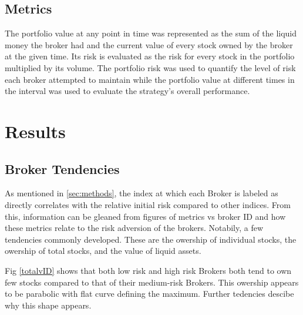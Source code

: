 \documentclass[letterpaper, 10 pt, proceedings]{ieeetran}
\begin{document}
	\subsection{Metrics}\label{subsec:metrics}	
	The portfolio value at any point in time was represented as the sum of the liquid money the broker had and the current value of every stock owned by the broker at the given time. Its risk is evaluated as the risk for every stock in the portfolio multiplied by its volume. The portfolio risk was used to quantify the level of risk each broker attempted to maintain while the portfolio value at different times in the interval was used to evaluate the strategy's overall performance.


	\section{Results}\label{sec:results}
	
	\subsection{Broker Tendencies}\label{subsec:tendencies}	
	As mentioned in \ref{sec:methods}, the index at which each Broker is labeled as directly correlates with the relative initial risk compared to other indices. From this, information can be gleaned from figures of metrics vs broker ID and how these metrics relate to the risk adversion of the brokers. Notabily, a few tendencies commonly developed. These are the owership of individual stocks, the owership of total stocks, and the value of liquid assets.\par
	Fig \ref{totalvID} shows that both low risk and high risk Brokers both tend to own few stocks compared to that of their medium-risk Brokers. This owership appears to be parabolic with flat curve defining the maximum. Further tedencies descibe why this shape appears. \par
\end{document}

